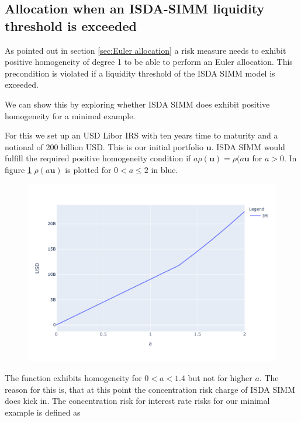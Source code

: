 \documentclass[../Thesis_AHoecherl.tex]{subfiles}
\begin{document}
    \subsection{Allocation when an ISDA-SIMM liquidity threshold is exceeded\label{sec:Allocation when an ISDA-SIMM liquidity threshold is exceeded}}
    
    As pointed out in section \ref{sec:Euler allocation} a risk measure needs to exhibit positive homogeneity of degree 1 to be able to perform an Euler allocation.
    This precondition is violated if a liquidity threshold of the ISDA SIMM model is exceeded.

    We can show this by exploring whether ISDA SIMM does exhibit positive homogeneity for a minimal example.

    For this we set up an USD Libor IRS with ten years time to maturity and a notional of 200 billion USD. This is our initial portfolio $\mathbf{u}$. ISDA SIMM would fulfill the required positive homogeneity condition if $a \rho(\mathbf{u}) = \rho(a \mathbf{u}$ for $a>0$. In figure \ref{fig:homogeneity of ISDA SIMM} $\rho(a\mathbf{u})$ is plotted for $0<a\leq 2$ in blue. 
    \begin{figure}
        \centering
        \includegraphics{Graphics/ISDA_SIMM_homogenity.pdf}
        \caption{}
        \label{fig:homogeneity of ISDA SIMM}
    \end{figure}
    The function exhibits homogeneity for $0<a<1.4$  but not for higher $a$. 
    The reason for this is, that at this point the concentration risk charge of ISDA SIMM does kick in.
    The concentration risk for interest rate risks for our minimal example is defined as \cite[Article 7.b]{SIMM}
\end{document}
